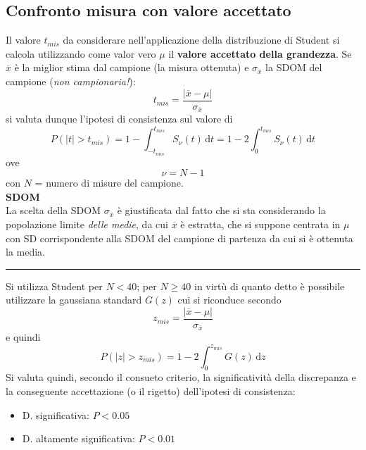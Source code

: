 \documentclass[10pt, oneside]{book}
\newcommand{\infobox}[2]{\vspace{0.5cm}~\\ \textbf{#1} \hrulefill \vspace{0.2cm}\\#2 {}\,\\\hrule \vspace{0.5cm}}
\newcommand{\integral}[4]{\int_{#1}^{#2} #3 \, \mathrm{d}#4}
\begin{document}
\subsection{Confronto misura con valore accettato}
Il valore $t_{mis}$ da considerare nell'applicazione della distribuzione di Student si calcola utilizzando come valor vero $\mu$ il \textbf{valore accettato della grandezza}. Se $\overline{x}$ è la miglior stima dal campione (la misura ottenuta) e $\sigma_{\overline{x}}$ la SDOM del campione (\textit{non campionaria!}):
\[t_{mis} = \frac{|\overline{x} - \mu|}{\sigma_{\overline{x}}}\]
si valuta dunque l'ipotesi di consistenza sul valore di
\[P(|t| > t_{mis}) = 1 - \integral{-t_{mis}}{t_{mis}}{S_\nu(t)}{t} = 1 - 2 \integral{0}{t_{mis}}{S_\nu (t)}{t}\]
ove
\[\nu = N - 1\]
con $N$ = numero di misure del campione.
\infobox{SDOM}{
La scelta della SDOM $\displaystyle \sigma_{\overline{x}}$ è giustificata dal fatto che si sta considerando la popolazione limite \textit{delle medie}, da cui $\overline{x}$ è estratta, che si suppone centrata in $\mu$ con SD corrispondente alla SDOM del campione di partenza da cui si è ottenuta la media.
}
Si utilizza Student per $N < 40$; per $N \geq 40$ in virtù di quanto detto è possibile utilizzare la gaussiana standard $G(z)$ cui si riconduce secondo
\[z_{mis} = \frac{|\overline{x} - \mu|}{\sigma_{\overline{x}}}\]
e quindi
\[P(|z| > z_{mis}) = 1 - 2 \integral{0}{z_{mis}}{G(z)}{z}\]
Si valuta quindi, secondo il consueto criterio, la significatività della discrepanza e la conseguente accettazione (o il rigetto) dell'ipotesi di consistenza:
\begin{itemize}
\item D. significativa: $P < 0.05$
\item D. altamente significativa: $P < 0.01$
\end{itemize}
\end{document}
